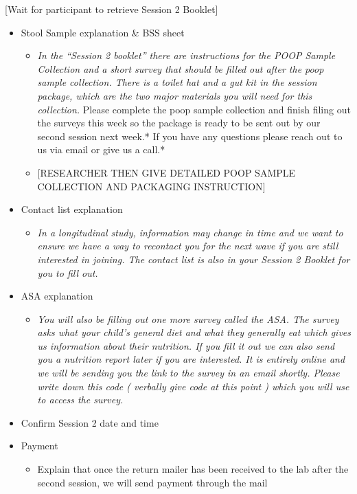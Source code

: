 \documentclass[]{book}
\providecommand{\tightlist}{%
  \setlength{\itemsep}{0pt}\setlength{\parskip}{0pt}}
\begin{document}
{[}Wait for participant to retrieve Session 2 Booklet{]}

\begin{itemize}
\item
  Stool Sample explanation \& BSS sheet

  \begin{itemize}
  \item
    \emph{In the ``Session 2 booklet'' there are instructions for the POOP Sample Collection and a short survey that should be filled out after the poop sample collection. There is a toilet hat and a gut kit in the session package, which are the two major materials you will need for this collection. }Please complete the poop sample collection and finish filing out the surveys this week so the package is ready to be sent out by our second session next week.* If you have any questions please reach out to us via email or give us a call.*
  \item
    {[}RESEARCHER THEN GIVE DETAILED POOP SAMPLE COLLECTION AND PACKAGING INSTRUCTION{]}
  \end{itemize}
\item
  Contact list explanation

  \begin{itemize}
  \tightlist
  \item
    \emph{In a longitudinal study, information may change in time and we want to ensure we have a way to recontact you for the next wave if you are still interested in joining. The contact list is also in your Session 2 Booklet for you to fill out.}
  \end{itemize}
\item
  ASA explanation

  \begin{itemize}
  \tightlist
  \item
    \emph{You will also be filling out one more survey called the ASA. The survey asks what your child's general diet and what they generally eat which gives us information about their nutrition. If you fill it out we can also send you a nutrition report later if you are interested. It is entirely online and we will be sending you the link to the survey in an email shortly. Please write down this code ( verbally give code at this point ) which you will use to access the survey. }
  \end{itemize}
\item
  Confirm Session 2 date and time
\item
  Payment

  \begin{itemize}
  \tightlist
  \item
    Explain that once the return mailer has been received to the lab after the second session, we will send payment through the mail
  \end{itemize}
\end{itemize}
\end{document}

